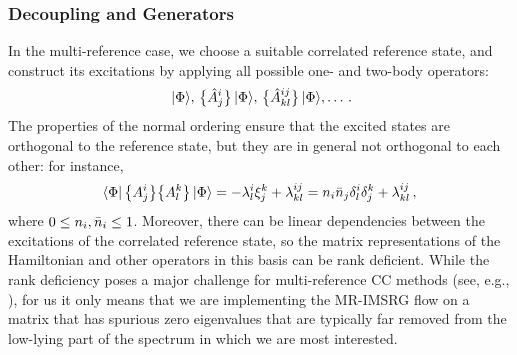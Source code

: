 {%
%
\subsubsection{Decoupling and Generators}
In the multi-reference case, we choose a suitable correlated reference 
state, and construct its excitations by applying all possible one- 
and two-body operators:
\begin{equation}
  \,|{\Phi}\rangle,\,\big\{\hat{A}^{i}_{j}\big\}\,|{\Phi}\rangle,\,\big\{\hat{A}^{ij}_{kl}\big\}\,|{\Phi}\rangle,\ldots\,.
\end{equation}
The properties of the normal ordering ensure that the excited states are
orthogonal to the reference state, but they are in general not orthogonal 
to each other: for instance,
\begin{equation}
  \langle{\Phi}|\,{\big\{A^{i}_{j}\big\}\big\{A^{k}_{l}\big\}}\,|{\Phi}\rangle
  =-\lambda^{i}_{l}\xi^{k}_{j} + \lambda^{ij}_{kl}
  =n_i\bar{n}_j \delta^{i}_{l}\delta^{k}_{j} + \lambda^{ij}_{kl}\,,
\end{equation}
where $0\leq n_i, \bar{n}_i \leq 1$. Moreover, there can be linear dependencies
between the excitations of the correlated reference state, so the matrix
representations of the Hamiltonian and other operators in this basis can 
be rank deficient. While the rank deficiency poses a major challenge for 
multi-reference CC methods (see, e.g., \cite{Lyakh:2012zr}), for us it only
means that we are implementing the MR-IMSRG flow on a matrix that has
spurious zero eigenvalues that are typically far removed from the low-lying
part of the spectrum in which we are most interested.

}
